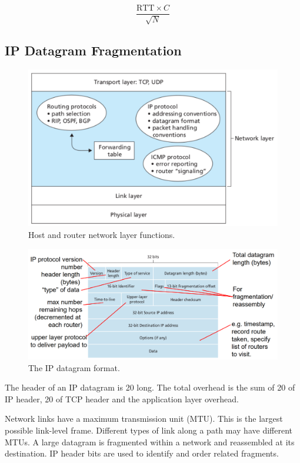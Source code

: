 \begin{equation*}
  \frac{\text{RTT} \times C}{\sqrt{N}}
\end{equation*}

\subsection{IP Datagram Fragmentation}

\begin{figure}[htp]
  \centering
  \includegraphics[width=12cm]{unit-19/figures/network-layer.png}
  \caption*{Host and router network layer functions.}
\end{figure}

\begin{figure}[htp]
  \centering
  \includegraphics[width=15cm]{unit-19/figures/ip-datagram.png}
  \caption*{The IP datagram format.}
\end{figure}

The header of an IP datagram is \SI{20}{\byte} long.
The total overhead is the sum of \SI{20}{\byte} of IP header, \SI{20}{\byte} of TCP header and the application layer overhead.

Network links have a maximum transmission unit (MTU).
This is the largest possible link-level frame.
Different types of link along a path may have different MTUs.
A large datagram is fragmented within a network and reassembled at its destination.
IP header bits are used to identify and order related fragments.


